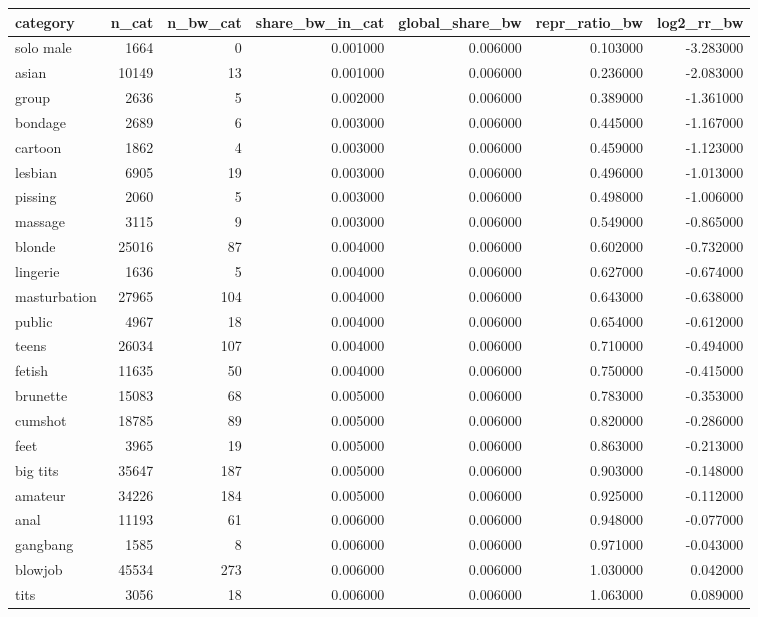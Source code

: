 \begin{tabular}{lrrrrrr}
\toprule
category & n_cat & n_bw_cat & share_bw_in_cat & global_share_bw & repr_ratio_bw & log2_rr_bw \\
\midrule
solo male & 1664 & 0 & 0.001000 & 0.006000 & 0.103000 & -3.283000 \\
asian & 10149 & 13 & 0.001000 & 0.006000 & 0.236000 & -2.083000 \\
group & 2636 & 5 & 0.002000 & 0.006000 & 0.389000 & -1.361000 \\
bondage & 2689 & 6 & 0.003000 & 0.006000 & 0.445000 & -1.167000 \\
cartoon & 1862 & 4 & 0.003000 & 0.006000 & 0.459000 & -1.123000 \\
lesbian & 6905 & 19 & 0.003000 & 0.006000 & 0.496000 & -1.013000 \\
pissing & 2060 & 5 & 0.003000 & 0.006000 & 0.498000 & -1.006000 \\
massage & 3115 & 9 & 0.003000 & 0.006000 & 0.549000 & -0.865000 \\
blonde & 25016 & 87 & 0.004000 & 0.006000 & 0.602000 & -0.732000 \\
lingerie & 1636 & 5 & 0.004000 & 0.006000 & 0.627000 & -0.674000 \\
masturbation & 27965 & 104 & 0.004000 & 0.006000 & 0.643000 & -0.638000 \\
public & 4967 & 18 & 0.004000 & 0.006000 & 0.654000 & -0.612000 \\
teens & 26034 & 107 & 0.004000 & 0.006000 & 0.710000 & -0.494000 \\
fetish & 11635 & 50 & 0.004000 & 0.006000 & 0.750000 & -0.415000 \\
brunette & 15083 & 68 & 0.005000 & 0.006000 & 0.783000 & -0.353000 \\
cumshot & 18785 & 89 & 0.005000 & 0.006000 & 0.820000 & -0.286000 \\
feet & 3965 & 19 & 0.005000 & 0.006000 & 0.863000 & -0.213000 \\
big tits & 35647 & 187 & 0.005000 & 0.006000 & 0.903000 & -0.148000 \\
amateur & 34226 & 184 & 0.005000 & 0.006000 & 0.925000 & -0.112000 \\
anal & 11193 & 61 & 0.006000 & 0.006000 & 0.948000 & -0.077000 \\
gangbang & 1585 & 8 & 0.006000 & 0.006000 & 0.971000 & -0.043000 \\
blowjob & 45534 & 273 & 0.006000 & 0.006000 & 1.030000 & 0.042000 \\
tits & 3056 & 18 & 0.006000 & 0.006000 & 1.063000 & 0.089000 \\

\end{tabular}
